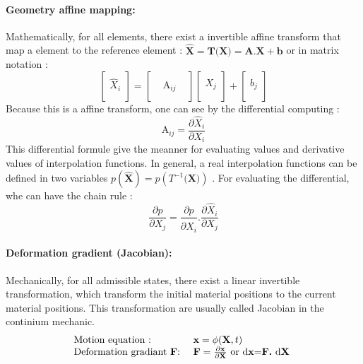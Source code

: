 \documentclass[a4paper,10pt]{article}
\begin{document}
\paragraph{Geometry affine mapping: }
Mathematically, for all elements, there exist a invertible affine transform that map a element to the reference element : $ \hat{\textbf{X}} = \textbf{T(X)} =\textbf{A.X} + \textbf{b}$ or in matrix notation :
\[
\left[
\begin{array}{c}
               \\
    \hat{X}_i  \\
               \\
\end{array}
\right]
=
\left[
\begin{array}{ccc}
  &                 & \\
  &  \text{A}_{ij}  & \\
  &                 & 
\end{array}
\right]
\left[
\begin{array}{c}
         \\
    X_j  \\
         \\     
\end{array}
\right]
+
\left[
\begin{array}{c}
         \\
    b_j  \\
         \\      
\end{array}
\right]
\]
Because this is a affine transform, one can see by the differential computing :
\[
\text{A}_{ij} = \frac{\partial \hat{X}_i }{\partial X_i} 
\]
This differential formule give the meanner for evaluating values and derivative values of interpolation functions. In general, a real interpolation functions can be defined in two variables $p(\hat{\textbf{X}}) = p(T^{-1}\textbf{(X)})$ . For evaluating the differential, whe can have the chain rule :   
\[
  \frac{\partial p}{\partial X_j}  = \frac{\partial p}{\partial \hat{X}_i } . \frac{\partial \hat{X}_i }{\partial X_j}
\]

\paragraph{Deformation gradient (Jacobian): }
Mechanically, for all admissible states, there exist a linear invertible transformation, which transform the initial material positions to the current material positions. This transformation are usually called Jacobian in the continium mechanic.
 \[
\begin{array}{ll}
\text{Motion equation                : } & \textbf{x}=\phi(\textbf{X},t) \\
\text{Deformation gradiant \textbf{F}: } & \textbf{F}=\frac{\partial \textbf{x}}{\partial \textbf{X}}  \text{   or d\textbf{x}=\textbf{F.} d\textbf{X} }
\end{array}
\]
\end{document}
